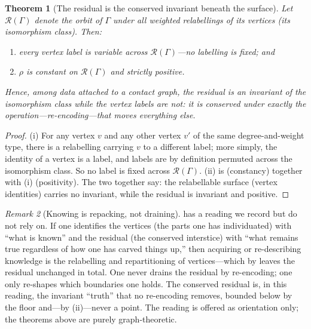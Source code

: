 \documentclass[11pt,a4paper]{article}
\theoremstyle{thmstyle}
\newtheorem{theorem}{Theorem}[section]
\theoremstyle{definition}
\theoremstyle{remark}
\newtheorem{remark}[theorem]{Remark}
\newcommand{\Gph}{\Gamma}                 %
\newcommand{\Res}{\rho}                   %
\begin{document}
\begin{theorem}[The residual is the conserved invariant beneath the surface]
\label{thm:residual-conserved}
Let $\mathcal{R}(\Gph)$ denote the orbit of $\Gph$ under all weighted
relabellings of its vertices \textup{(}its isomorphism class\textup{)}. Then:
\begin{enumerate}[label=\textup{(\roman*)},leftmargin=2.2em]
\item every vertex label is variable across $\mathcal{R}(\Gph)$---no labelling is
fixed; and
\item $\Res$ is constant on $\mathcal{R}(\Gph)$ and strictly positive.
\end{enumerate}
Hence, among data attached to a contact graph, the residual is an invariant of
the isomorphism class while the vertex labels are not: it is conserved under
exactly the operation---re-encoding---that moves everything else.
\end{theorem}

\begin{proof}
(i) For any vertex $v$ and any other vertex $v'$ of the same degree-and-weight
type, there is a relabelling carrying $v$ to a different label; more simply, the
identity of a vertex is a label, and labels are by definition permuted across the
isomorphism class. So no label is fixed across $\mathcal{R}(\Gph)$. (ii) is
 (constancy) together with
(i) (positivity). The two together say: the
relabellable surface (vertex identities) carries no invariant, while the residual
is invariant and positive.
\end{proof}

\begin{remark}[Knowing is repacking, not draining]
\label{rem:repacking}
 has a reading we record but do not rely on. If one
identifies the vertices (the parts one has individuated) with ``what is known''
and the residual (the conserved interstice) with ``what remains true regardless
of how one has carved things up,'' then acquiring or re-describing knowledge is
the relabelling and repartitioning of vertices---which by
 leaves the residual unchanged in total. One never
drains the residual by re-encoding; one only re-shapes which boundaries one
holds. The conserved residual is, in this reading, the invariant ``truth'' that
no re-encoding removes, bounded below by the floor and---by
(ii)---never a point. The reading is offered as
orientation only; the theorems above are purely graph-theoretic.
\end{remark}
\end{document}

